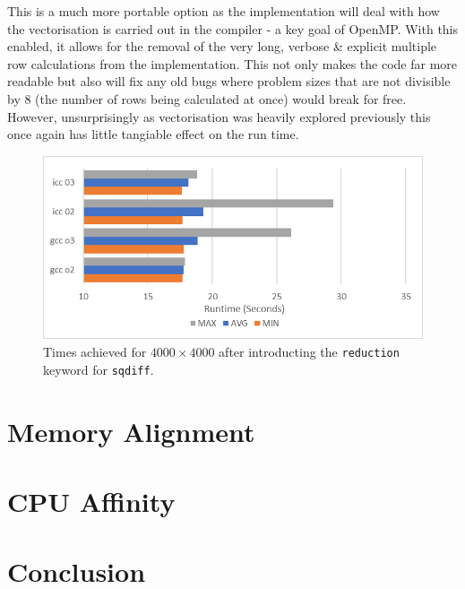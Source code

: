 \documentclass[11pt,twocolumn,a4paper]{article}
\begin{document}
This is a much more portable option as the implementation will deal with how the vectorisation is carried out in the compiler - a key goal of OpenMP. With this enabled, it allows for the removal of the very long, verbose \& explicit multiple row calculations from the implementation. This not only makes the code far more readable but also will fix any old bugs where problem sizes that are not divisible by 8 (the number of rows being calculated at once) would break for free. However, unsurprisingly as vectorisation was heavily explored previously this once again has little tangiable effect on the run time. \par

\begin{figure}[h]
        \centering
        \includegraphics[width=0.8\linewidth]{figures/4-SIMD-W-REDUX.png}
        \caption{Times achieved for $4000\times4000$ after introducting the \texttt{reduction} keyword for \texttt{sqdiff}.}
        \label{fig-3-redux}
\end{figure}


\section{Memory Alignment}



\section{CPU Affinity}



\vspace{-0.1cm}
\section{Conclusion}
\end{document}
